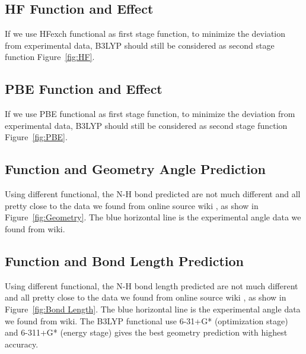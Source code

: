 \documentclass{article}
\begin{document}
\subsection{HF Function and Effect}
If we use HFexch functional as first stage function, to minimize the deviation from experimental data, B3LYP should still be considered as second stage function Figure~\ref{fig:HF}. 

\subsection{PBE Function and Effect}
If we use PBE functional as first stage function, to minimize the deviation from experimental data, B3LYP should still be considered as second stage function Figure~\ref{fig:PBE}. 

\subsection{Function and Geometry Angle Prediction}
Using different functional, the N-H bond predicted are not much different and all pretty close to the data we found from online source wiki \cite{Wiki}, as show in Figure~\ref{fig:Geometry}. The blue horizontal line is the experimental angle data we found from wiki. 

\subsection{Function and Bond Length Prediction}
Using different functional, the N-H bond length predicted are not much different and all pretty close to the data we found from online source wiki \cite{Wiki}, as show in Figure~\ref{fig:Bond Length}. The blue horizontal line is the experimental angle data we found from wiki. The B3LYP functional use 6-31+G* (optimization stage) and 6-311+G* (energy stage) gives the best geometry prediction with highest accuracy.
\end{document}
